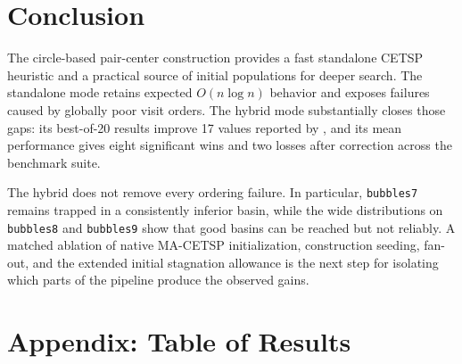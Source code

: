 \documentclass[11pt]{article}
\begin{document}
\section{Conclusion}

The circle-based pair-center construction provides a fast standalone CETSP
heuristic and a practical source of initial populations for deeper search. The
standalone mode retains expected $O(n\log n)$ behavior and exposes failures
caused by globally poor visit orders. The hybrid mode substantially closes
those gaps: its best-of-20 results improve 17 values reported by
\textcite{LeiHao2024}, and its mean performance gives eight significant wins
and two losses after correction across the benchmark suite.

The hybrid does not remove every ordering failure. In particular,
\texttt{bubbles7} remains trapped in a consistently inferior basin, while the
wide distributions on \texttt{bubbles8} and \texttt{bubbles9} show that good
basins can be reached but not reliably. A matched ablation of native MA-CETSP
initialization, construction seeding, fan-out, and the extended initial
stagnation allowance is the next step for isolating which parts of the pipeline
produce the observed gains.

\pagebreak
\printbibliography
\pagebreak

\appendix
\section{Appendix: Table of Results}
\end{document}

